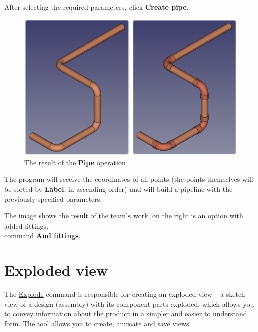 \documentclass[a4paper,12pt]{article}
\begin{document}
After selecting the required parameters, click \textbf{Create pipe}.

\begin{figure}[htp]
	\centering
	\includegraphics[width=1\textwidth]{img/pipe_result.png}
	\caption{The result of the \textbf{Pipe} operation}
	\label{sec:pipe_result}
\end{figure}

The program will receive the coordinates of all points (the points themselves will be sorted by \textbf{Label}, in ascending order) and will build a pipeline with the previously specified parameters.

The image shows the result of the team's work, on the right is an option with added fittings,\\command \textbf{And fittings}.

\pagebreak




\section{Exploded view}

The \hyperref[sec:8]{Explode} command is responsible for creating an exploded view -- a sketch view of a design (assembly) with its component parts exploded, which allows you to convey information about the product in a simpler and easier to understand form. The tool allows you to create, animate and save views.
\end{document}
